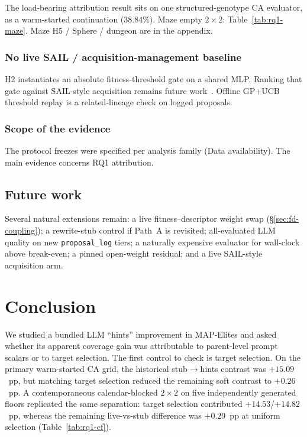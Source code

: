 \documentclass[preprint,12pt]{elsarticle}
\begin{document}
The load-bearing attribution result sits on one structured-genotype CA evaluator, as a warm-started continuation ($38.84\%$). Maze empty $2\times2$: Table~\ref{tab:rq1-maze}. Maze H5 / Sphere / dungeon are in the appendix.

\subsubsection{No live SAIL / acquisition-management baseline}
\label{sec:no-sail}

H2 instantiates an absolute fitness-threshold gate on a shared MLP. Ranking that gate against SAIL-style acquisition remains future work~\cite{gaier2018sail}. Offline GP+UCB threshold replay is a related-lineage check on logged proposals.

\subsubsection{Scope of the evidence}

The protocol freezes were specified per analysis family (Data availability). The main evidence concerns RQ1 attribution.

\subsection{Future work}

Several natural extensions remain: a live fitness--descriptor weight swap (\S\ref{sec:fd-coupling}); a rewrite-stub control if Path~A is revisited; all-evaluated LLM quality on new \texttt{proposal\_log} tiers; a naturally expensive evaluator for wall-clock above break-even; a pinned open-weight residual; and a live SAIL-style acquisition arm.

\section{Conclusion}
\label{sec:conclusion}

We studied a bundled LLM ``hints'' improvement in MAP-Elites and asked whether its apparent coverage gain was attributable to parent-level prompt scalars or to target selection. The first control to check is target selection. On the primary warm-started CA grid, the historical stub$\rightarrow$hints contrast was $+15.09$~pp, but matching target selection reduced the remaining soft contrast to $+0.26$~pp. A contemporaneous calendar-blocked $2\times2$ on five independently generated floors replicated the same separation: target selection contributed $+14.53$/$+14.82$~pp, whereas the remaining live-vs-stub difference was $+0.29$~pp at uniform selection (Table~\ref{tab:rq1-cf}).
\end{document}
